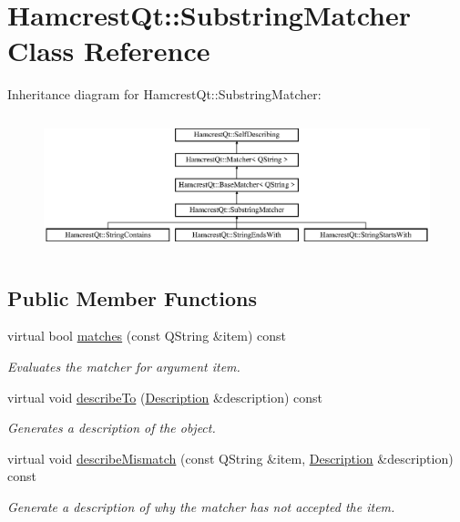 \hypertarget{class_hamcrest_qt_1_1_substring_matcher}{\section{Hamcrest\-Qt\-:\-:Substring\-Matcher Class Reference}
\label{class_hamcrest_qt_1_1_substring_matcher}
}
Inheritance diagram for Hamcrest\-Qt\-:\-:Substring\-Matcher\-:\begin{figure}[H]
\begin{center}
\leavevmode
\includegraphics[height=3.988604cm]{class_hamcrest_qt_1_1_substring_matcher}
\end{center}
\end{figure}
\subsection*{Public Member Functions}
\begin{DoxyCompactItemize}
\item 
virtual bool \hyperlink{class_hamcrest_qt_1_1_substring_matcher_a52111254de729e8ffe6392aaeba1f08b}{matches} (const Q\-String \&item) const 
\begin{DoxyCompactList}\small\item\em Evaluates the matcher for argument {\itshape item}. \end{DoxyCompactList}\item 
virtual void \hyperlink{class_hamcrest_qt_1_1_substring_matcher_af3f68e4871350cdecdf145575593e671}{describe\-To} (\hyperlink{class_hamcrest_qt_1_1_description}{Description} \&description) const 
\begin{DoxyCompactList}\small\item\em Generates a description of the object. \end{DoxyCompactList}\item 
virtual void \hyperlink{class_hamcrest_qt_1_1_substring_matcher_a23bb6d4b756dd8745a883eb88a993a2b}{describe\-Mismatch} (const Q\-String \&item, \hyperlink{class_hamcrest_qt_1_1_description}{Description} \&description) const 
\begin{DoxyCompactList}\small\item\em Generate a description of why the matcher has not accepted the item. \end{DoxyCompactList}\end{DoxyCompactItemize}
